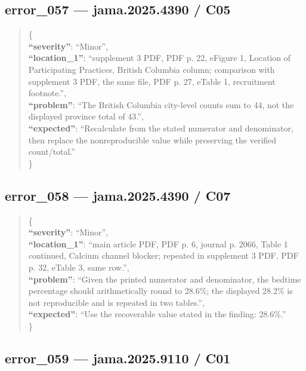 \documentclass[
  letterpaper,
  9pt]{extreport}
\begin{document}
\hypertarget{error_057--jama20254390--c05}{%
\subsection{error\_057 --- jama.2025.4390 /
C05}\label{error_057--jama20254390--c05}}

\begin{quote}
\{\\
\textbf{``severity''}: ``Minor'',\\
\textbf{``location\_1''}: ``supplement 3 PDF, PDF p. 22, eFigure 1,
Location of Participating Practices, British Columbia column; comparison
with supplement 3 PDF, the same file, PDF p. 27, eTable 1, recruitment
footnote.'',\\
\textbf{``problem''}: ``The British Columbia city-level counts sum to
44, not the displayed province total of 43.'',\\
\textbf{``expected''}: ``Recalculate from the stated numerator and
denominator, then replace the nonreproducible value while preserving the
verified count/total.''\\
\}
\end{quote}

\hypertarget{error_058--jama20254390--c07}{%
\subsection{error\_058 --- jama.2025.4390 /
C07}\label{error_058--jama20254390--c07}}

\begin{quote}
\{\\
\textbf{``severity''}: ``Minor'',\\
\textbf{``location\_1''}: ``main article PDF, PDF p. 6, journal p. 2066,
Table 1 continued, Calcium channel blocker; repeated in supplement 3
PDF, PDF p. 32, eTable 3, same row.'',\\
\textbf{``problem''}: ``Given the printed numerator and denominator, the
bedtime percentage should arithmetically round to 28.6\%; the displayed
28.2\% is not reproducible and is repeated in two tables.'',\\
\textbf{``expected''}: ``Use the recoverable value stated in the
finding: 28.6\%.''\\
\}
\end{quote}

\hypertarget{error_059--jama20259110--c01}{%
\subsection{error\_059 --- jama.2025.9110 /
C01}\label{error_059--jama20259110--c01}}
\end{document}
